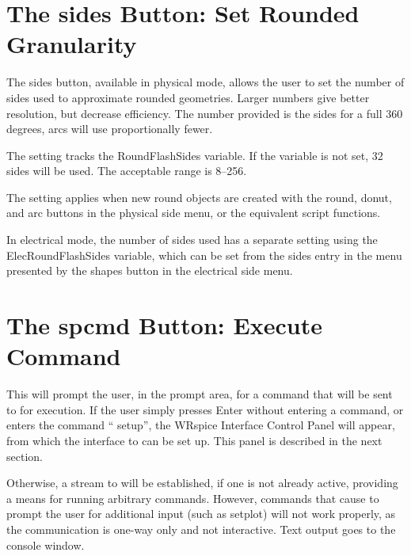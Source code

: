 \section{The {\cb sides} Button: Set Rounded Granularity}
The {\cb sides} button, available in physical mode, allows the user to
set the number of sides used to approximate rounded geometries. 
Larger numbers give better resolution, but decrease efficiency.  The
number provided is the sides for a full 360 degrees, arcs will use
proportionally fewer. 

The setting tracks the {\et RoundFlashSides} variable.  If the
variable is not set, 32 sides will be used.  The acceptable range is
8--256.

The setting applies when new round objects are created with the {\cb
round}, {\cb donut}, and {\cb arc} buttons in the physical side menu,
or the equivalent script functions. 

In electrical mode, the number of sides used has a separate setting
using the {\et ElecRoundFlashSides} variable, which can be set from
the {\cb sides} entry in the menu presented by the {\cb shapes} button
in the electrical side menu.


\section{The {\cb spcmd} Button: Execute {\WRspice} Command}

This will prompt the user, in the prompt area, for a command that will
be sent to {\WRspice} for execution.  If the user simply presses {\kb
Enter} without entering a command, or enters the command ``{\vt
setup}'', the {\cb WRspice Interface Control Panel} will appear, from
which the interface to {\WRspice} can be set up.  This panel is
described in the next section.

Otherwise, a stream to {\WRspice} will be established, if one is not
already active, providing a means for running arbitrary {\WRspice}
commands.  However, commands that cause {\WRspice} to prompt the user
for additional input (such as {\vt setplot}) will not work properly,
as the communication is one-way only and not interactive.  Text output
goes to the console window.

